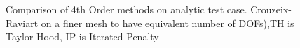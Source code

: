 \begin{figure}
  \centering
  \caption{Comparison of 4th Order methods on analytic test case.  Crouzeix-Raviart on a finer mesh
     to have equivalent number of DOFs),TH is Taylor-Hood, IP is Iterated Penalty}
   \label{terrel:fig:4th_Order}
\end{figure}

